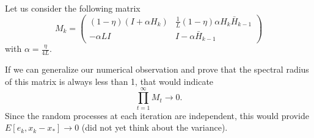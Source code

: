 \documentclass[11pt]{article}
\begin{document}

 
\noindent 
Let us consider the following matrix
\[
 M_k = \begin{pmatrix} (1-\eta)(I+\alpha H_k) & \displaystyle\frac{1}{L} (1-\eta)\alpha H_k\bar H_{k-1}\\  
                   -\alpha LI  & I-\alpha\bar H_{k-1} \end{pmatrix}                  
\]
with $\alpha=\displaystyle\frac{\eta}{4L}$.

%

If we can generalize our numerical observation and prove that the spectral radius of this matrix is always less than 1, that would indicate 
\[
\prod_{t=1}^\infty M_t \rightarrow 0. 
\]
Since the random processes at each iteration are independent, this would provide $E[e_k, x_k-x_\ast]\rightarrow 0$ (did not yet think about the variance).


\bigskip
\end{document}
